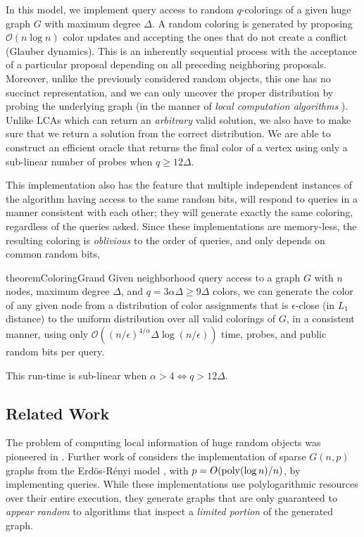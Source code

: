 In this model, we implement query access to random $q$-colorings of a given huge graph $G$ with maximum degree $\Delta$.
A random coloring is generated by proposing $\mathcal O(n\log n)$ color updates and accepting the ones that do not create a conflict (Glauber dynamics).
This is an inherently sequential process with the acceptance of a particular proposal depending on all preceding neighboring proposals.
Moreover, unlike the previously considered random objects, this one has no succinct representation, and we can only uncover the proper distribution
by probing the underlying graph (in the manner of \emph{local computation algorithms} \cite{LCA, LCA_space_efficient}).
Unlike LCAs which can return an \emph{arbitrary} valid solution, we also have to make sure that we return a solution from the correct distribution.
We are able to construct an efficient oracle that returns the final color of a vertex using only a sub-linear number of probes when $q\ge 12\Delta$.

This implementation also has the feature that multiple independent instances of the algorithm having access to the same random bits,
will respond to queries in a manner consistent with each other; they will generate exactly the same coloring, regardless of the queries asked.
Since these implementations are memory-less, the resulting coloring is \emph{oblivious} to the order of queries,
and only depends on common random bits,

\begin{restatable}{theorem}{ColoringGrand}
\label{thm:coloring_grand}
Given neighborhood query access to a graph $G$ with $n$ nodes, maximum degree $\Delta$, and $q=3\alpha\Delta \ge 9\Delta$ colors,
we can generate the color of any given node from a distribution of color assignments that is $\epsilon$-close (in $L_1$ distance)
to the uniform distribution over all valid colorings of $G$, in a consistent manner,
using only $\mathcal O((n/\epsilon)^{4/\alpha}\Delta\log (n/\epsilon))$ time, probes, and public random bits per query.
\end{restatable}
This run-time is sub-linear when $\alpha > 4 \iff q > 12\Delta$.




\subsection{Related Work}
\label{sec:related_work}
The problem of computing local information of huge random objects was pioneered in \cite{huge_old,huge}.
Further work of \cite{sparse} considers the implementation of sparse $G(n,p)$ graphs from the Erd\"{o}s-R\'{e}nyi model \cite{er},
with $p = O(\mathrm{poly}(\log n)/n)$, by implementing  queries.
While these implementations use polylogarithmic resources over their entire execution,
they generate graphs that are only guaranteed to \emph{appear random} to algorithms that inspect a \emph{limited portion} of the generated graph.

